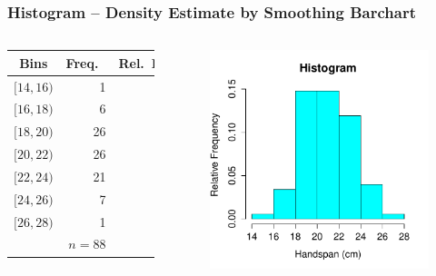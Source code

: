 \begin{frame}
\frametitle{Histogram -- Density Estimate by Smoothing Barchart}
\footnotesize
\singlespacing

\begin{columns}
\begin{tabular}{crr}
Bins & Freq.\ & Rel.\ Freq.\ \\
\hline
 $[14,16)$&1& 0.01\\
 $[16,18)$&6& 0.07\\
 $[18,20)$&26&0.30 \\
 $[20,22)$&26&0.30 \\
 $[22,24)$&21&0.24 \\
 $[24,26)$&7&0.08 \\
 $[26,28)$&1&0.01\\
 \hline
 & $n=88$&1.00
\end{tabular}
\begin{figure}
	\centering
	\includegraphics[scale = 0.5]{./images/handspan_truehist}
\end{figure}
\end{columns}
\end{frame}
